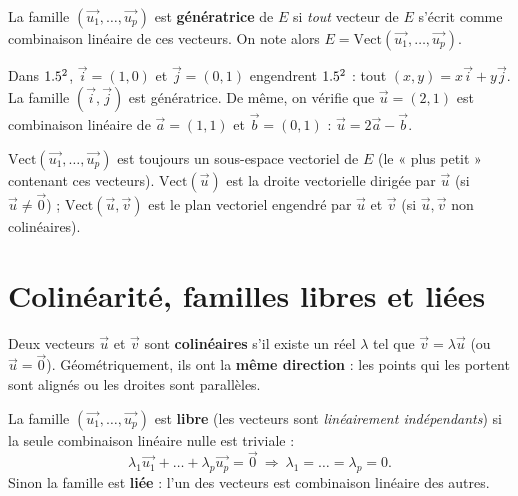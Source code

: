 \begin{definition}
La famille $(\vec{u_1},\dots,\vec{u_p})$ est \textbf{génératrice} de $E$ si \emph{tout} vecteur
de $E$ s'écrit comme combinaison linéaire de ces vecteurs. On note alors
$E=\mathrm{Vect}(\vec{u_1},\dots,\vec{u_p})$.
\end{definition}

\begin{exemple}
Dans $1.5^2$, $\vec i=(1,0)$ et $\vec j=(0,1)$ engendrent $1.5^2$ : tout $(x,y)=x\vec i+y\vec j$.
La famille $(\vec i,\vec j)$ est génératrice. De même, on vérifie que $\vec u=(2,1)$ est
combinaison linéaire de $\vec a=(1,1)$ et $\vec b=(0,1)$ : $\vec u=2\vec a-\vec b$.
\end{exemple}

\begin{remarque}
$\mathrm{Vect}(\vec{u_1},\dots,\vec{u_p})$ est toujours un sous-espace vectoriel de $E$
(le « plus petit » contenant ces vecteurs). $\mathrm{Vect}(\vec u)$ est la droite vectorielle
dirigée par $\vec u$ (si $\vec u\neq\vec 0$) ; $\mathrm{Vect}(\vec u,\vec v)$ est le plan
vectoriel engendré par $\vec u$ et $\vec v$ (si $\vec u,\vec v$ non colinéaires).
\end{remarque}

\section{Colinéarité, familles libres et liées}

\begin{definition}
Deux vecteurs $\vec u$ et $\vec v$ sont \textbf{colinéaires} s'il existe un réel $\lambda$ tel que
$\vec v=\lambda\vec u$ (ou $\vec u=\vec 0$). Géométriquement, ils ont la \textbf{même direction} :
les points qui les portent sont alignés ou les droites sont parallèles.
\end{definition}

\begin{definition}
La famille $(\vec{u_1},\dots,\vec{u_p})$ est \textbf{libre} (les vecteurs sont \emph{linéairement indépendants}) si la seule combinaison linéaire nulle est triviale :
\[
\lambda_1\vec{u_1}+\dots+\lambda_p\vec{u_p}=\vec 0\ \Longrightarrow\ \lambda_1=\dots=\lambda_p=0.
\]
Sinon la famille est \textbf{liée} : l'un des vecteurs est combinaison linéaire des autres.
\end{definition}

